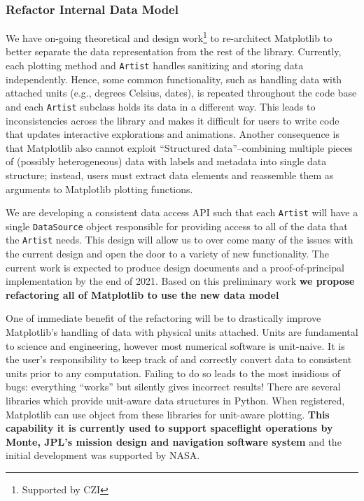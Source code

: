 \documentclass[12pt]{article}
\numberwithin{page}{section}
\begin{document}
\subsubsection{Refactor Internal Data Model}


We have on-going theoretical and design work\footnote{Supported by
CZI} to re-architect Matplotlib to better separate the data
representation from the rest of the library.  Currently, each plotting
method and \texttt{Artist} handles sanitizing and storing data
independently.  Hence, some common functionality, such as handling
data with attached units (e.g., degrees Celsius, dates), is repeated
throughout the code base and each \texttt{Artist} subclass holds its
data in a different way.  This leads to inconsistencies across the
library and makes it difficult for users to write code that updates
interactive explorations and animations.  Another consequence is that
Matplotlib also cannot exploit ``Structured data''--combining multiple
pieces of (possibly heterogeneous) data with labels and metadata into
single data structure; instead, users must extract data elements and
reassemble them as arguments to Matplotlib plotting functions.


We are developing a consistent data access API such that each
\texttt{Artist} will have a single \texttt{DataSource} object
responsible for providing access to all of the data that the
\texttt{Artist} needs.  This design will allow us to over come many of
the issues with the current design and open the door to a variety of
new functionality.  The current work is expected to produce design
documents and a proof-of-principal implementation by the end of 2021.
Based on this preliminary work \textbf{we propose refactoring
  all of Matplotlib to use the new data model}

One of immediate benefit of the refactoring will be to drastically
improve Matplotlib's handling of data with physical units attached.
Units are fundamental to science and engineering, however most
numerical software is unit-naive.  It is the user's responsibility to
keep track of and correctly convert data to consistent units prior to
any computation.  Failing to do so leads to the most insidious of
bugs: everything ``works'' but silently gives incorrect results!
There are several libraries which provide unit-aware data structures
in Python.  When registered, Matplotlib can use object from these
libraries for unit-aware plotting.  \textbf{This capability it is
  currently used to support spaceflight operations by Monte, JPL's
  mission design and navigation software system} and the initial
development was supported by NASA.
\end{document}

